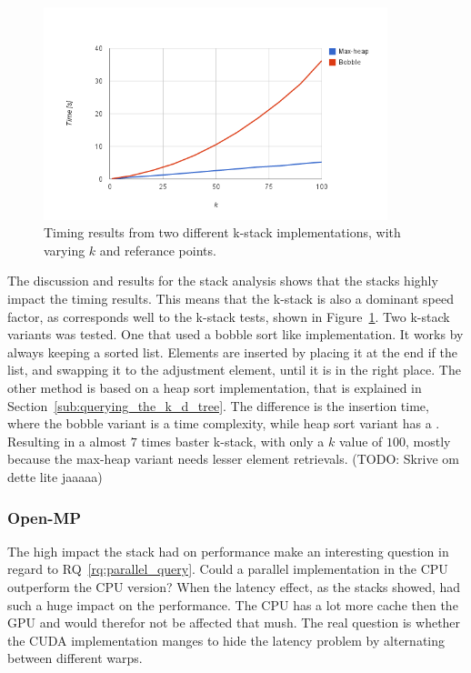 \begin{figure}[ht!]
    \centering
    \includegraphics[width=100mm]{../gfx/k_stack.png}

    \caption{Timing results from two different k-stack implementations, with varying $k$ and  referance points. }
    \label{tbl:k_stack}
\end{figure}


The discussion and results for the stack analysis shows that the stacks highly impact the timing results. This means that the k-stack is also a dominant  speed factor, as corresponds well to the k-stack tests, shown in Figure~\ref{tbl:k_stack}. Two k-stack variants was tested. One that used a bobble sort\cite{Cormen:2001} like implementation. It works by always keeping a sorted list. Elements are inserted by placing it at the end if the list, and swapping it to the adjustment element, until it is in the right place. The other method is based on a heap sort implementation, that is explained in Section~\ref{sub:querying_the_k_d_tree}. The difference is the insertion time, where the bobble variant is a  time complexity, while heap sort variant has a . Resulting in a almost $7$ times baster k-stack, with only a $k$ value of $100$, mostly because the max-heap variant needs lesser element retrievals. (TODO: Skrive om dette lite jaaaaa)


\subsubsection{Open-MP} %
\label{ssub:open_mp_version}

The high impact the stack had on performance make an interesting question in regard to RQ~\ref{rq:parallel_query}. Could a parallel implementation in the CPU outperform the CPU version? When the latency effect, as the stacks showed, had such a huge impact on the performance. The CPU has a lot more cache then the GPU and would therefor not be affected that mush. The real question is whether the CUDA implementation manges to hide the latency problem by alternating between different warps.

